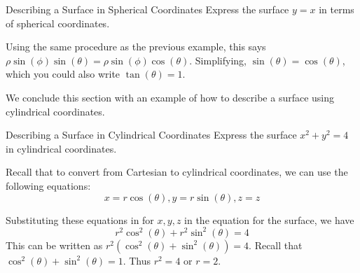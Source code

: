 \begin{example}{Describing a Surface in Spherical Coordinates}{}
Express the surface $y=x$ in terms of spherical coordinates.
\end{example}

\begin{solution}
Using the same procedure as the previous example, this says $\allowbreak \rho \sin \left( \phi \right) \sin \left( \theta
\right) =\rho \sin \left( \phi \right) \cos \left( \theta \right)$. Simplifying,  $\sin \left( \theta \right) =\cos \left( \theta \right)$, which you could also write $\tan \left( \theta \right)=1$.
\end{solution}

We conclude this section with an example of how to describe a surface using cylindrical coordinates. 

\begin{example}{Describing a Surface in Cylindrical Coordinates}{}
Express the surface $x^{2}+y^{2}=4$ in cylindrical coordinates.
\end{example}

\begin{solution}
Recall that to convert from Cartesian to cylindrical coordinates, we can use the following equations:
\[
x =r\cos \left( \theta \right) , y=r\sin \left( \theta \right) , z =z
\]

Substituting these equations in for $x,y,z$ in the equation for the surface, we have  
\[
r^{2}\cos ^{2} \left( \theta \right) +r^{2}\sin ^{2} \left( \theta \right)=4
\]
This can be written as $r^2 ( \cos^{2} \left( \theta \right)+ \sin^{2} \left(\theta\right) ) = 4$. Recall that $ \cos^{2} \left( \theta \right)+ \sin^{2} \left( \theta \right)=1$.  Thus $r^{2} = 4$ or $r=2$.
\end{solution}